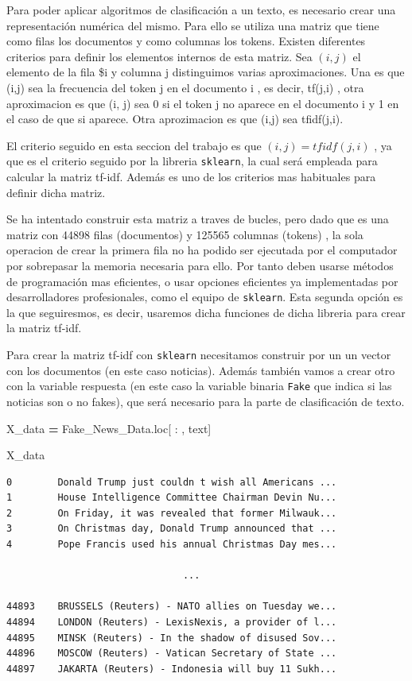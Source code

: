 \documentclass[
  11pt,
  a4paper,
]{article}
\newenvironment{Shaded}{\begin{snugshade}}{\end{snugshade}}
\newcommand{\NormalTok}[1]{#1}
\newcommand{\OperatorTok}[1]{\textcolor[rgb]{0.81,0.36,0.00}{\textbf{#1}}}
\newcommand{\StringTok}[1]{\textcolor[rgb]{0.31,0.60,0.02}{#1}}
\begin{document}
Para poder aplicar algoritmos de clasificación a un texto, es necesario
crear una representación numérica del mismo. Para ello se utiliza una
matriz que tiene como filas los documentos y como columnas los tokens.
Existen diferentes criterios para definir los elementos internos de esta
matriz. Sea \((i,j)\) el elemento de la fila \$i y columna j
distinguimos varias aproximaciones. Una es que (i,j) sea la frecuencia
del token j en el documento i , es decir, tf(j,i) , otra aproximacion es
que (i, j) sea 0 si el token j no aparece en el documento i y 1 en el
caso de que si aparece. Otra aprozimacion es que (i,j) sea tfidf(j,i).

El criterio seguido en esta seccion del trabajo es que
\((i,j) = tfidf(j,i)\) , ya que es el criterio seguido por la libreria
\texttt{sklearn}, la cual será empleada para calcular la matriz tf-idf.
Además es uno de los criterios mas habituales para definir dicha matriz.

Se ha intentado construir esta matriz a traves de bucles, pero dado que
es una matriz con 44898 filas (documentos) y 125565 columnas (tokens) ,
la sola operacion de crear la primera fila no ha podido ser ejecutada
por el computador por sobrepasar la memoria necesaria para ello. Por
tanto deben usarse métodos de programación mas eficientes, o usar
opciones eficientes ya implementadas por desarrolladores profesionales,
como el equipo de \texttt{sklearn}. Esta segunda opción es la que
seguiresmos, es decir, usaremos dicha funciones de dicha libreria para
crear la matriz tf-idf.

Para crear la matriz tf-idf con \texttt{sklearn} necesitamos construir
por un un vector con los documentos (en este caso noticias). Además
también vamos a crear otro con la variable respuesta (en este caso la
variable binaria \texttt{Fake} que indica si las noticias son o no
fakes), que será necesario para la parte de clasificación de texto.

\begin{Shaded}
\begin{Highlighting}[]
\NormalTok{X\_data }\OperatorTok{=}\NormalTok{ Fake\_News\_Data.loc[ : , }\StringTok{\textquotesingle{}text\textquotesingle{}}\NormalTok{]}

\NormalTok{X\_data}
\end{Highlighting}
\end{Shaded}

\begin{verbatim}
0        Donald Trump just couldn t wish all Americans ...
1        House Intelligence Committee Chairman Devin Nu...
2        On Friday, it was revealed that former Milwauk...
3        On Christmas day, Donald Trump announced that ...
4        Pope Francis used his annual Christmas Day mes...
                               
                               ... 
                               
44893    BRUSSELS (Reuters) - NATO allies on Tuesday we...
44894    LONDON (Reuters) - LexisNexis, a provider of l...
44895    MINSK (Reuters) - In the shadow of disused Sov...
44896    MOSCOW (Reuters) - Vatican Secretary of State ...
44897    JAKARTA (Reuters) - Indonesia will buy 11 Sukh...
\end{verbatim}
\end{document}
